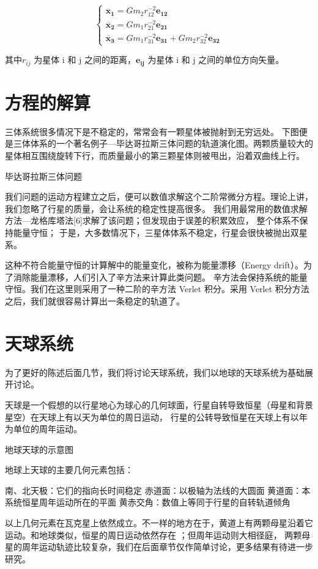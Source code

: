 \documentclass[a4paper,10.5pt]{book}
\begin{document}
$$
\begin{cases}
\ddot{\mathbf{x_1}} = Gm_2r_{12}^{-2} \mathbf{e_{12}}\\
\ddot{\mathbf{x_2}} = Gm_1r_{21}^{-2} \mathbf{e_{21}}\\
\ddot{\mathbf{x_3}} = Gm_1r_{31}^{-2} \mathbf{e_{31}} + Gm_2r_{32}^{-2} \mathbf{e_{32}}
\end{cases}
$$

其中$r_{ij}$ 为星体 i 和 j 之间的距离，$\mathbf{e_{ij}}$ 为星体 i 和 j 之间的单位方向矢量。

\section{方程的解算}

三体系统很多情况下是不稳定的，常常会有一颗星体被抛射到无穷远处。
下图便是三体体系的一个著名例子—毕达哥拉斯三体问题的轨道演化图。两颗质量较大的星体相互围绕旋转下行，而质量最小的第三颗星体则被甩出，沿着双曲线上行。

毕达哥拉斯三体问题

我们问题的运动方程建立之后，便可以数值求解这个二阶常微分方程。理论上讲，我们忽略了行星的质量，会让系统的稳定性提高很多。
我们用最常用的数值求解方法—龙格库塔法[6]求解了该问题；但发现由于误差的积累效应， 整个体系不保持能量守恒；
于是，大多数情况下，三星体体系不稳定，行星会很快被抛出双星系。

这种不符合能量守恒的计算解中的能量变化，被称为能量漂移（Energy drift）。为了消除能量漂移，人们引入了辛方法来计算此类问题。
辛方法会保持系统的能量守恒。我们在这里则采用了一种二阶的辛方法 Verlet 积分。采用 Verlet 积分方法之后，我们就很容易计算出一条稳定的轨道了。

\section{天球系统}

为了更好的陈述后面几节，我们将讨论天球系统，我们以地球的天球系统为基础展开讨论。

天球是一个假想的以行星地心为球心的几何球面，行星自转导致恒星（母星和背景星空）在天球上有以天为单位的周日运动，
行星的公转导致恒星在天球上有以年为单位的周年运动。

地球天球的示意图

地球上天球的主要几何元素包括：

南、北天极：它们的指向长时间稳定
赤道面：以极轴为法线的大圆面
黄道面：本系统恒星周年运动所在的平面
黄赤交角：数值上等同于行星的自转轨道倾角

以上几何元素在瓦克星上依然成立。不一样的地方在于，黄道上有两颗母星沿着它运动。和地球类似，恒星的周日运动依然存在 ；但周年运动则大相径庭，
两颗母星的周年运动轨迹比较复杂，我们在后面章节仅作简单讨论，更多结果有待进一步研究。
\end{document}
